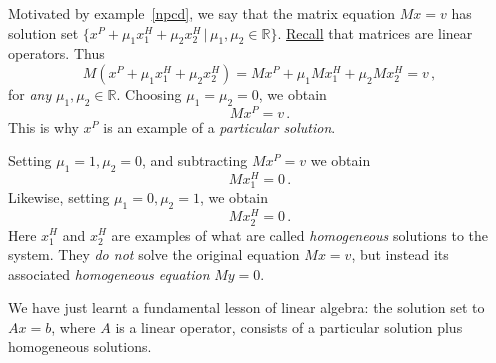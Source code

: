 %
%
Motivated by example~\ref{npcd}, we say that the matrix equation $Mx=v$ has  solution set  $\{ x^P  + \mu_1 x^H _1 + \mu_2 x^H _2\,  |\,  \mu_1,\mu_2 \in {\mathbb R} \}$.
\hyperlink{earlier}{Recall}  that matrices are linear operators.
%
%
Thus 
\[M( x^P  + \mu_1 x^H _1 + \mu_2 x^H _2)  = Mx^P  + \mu_1Mx^H _1 + \mu_2Mx^H _2 =v\, ,\]
for \emph{any} $\mu_1, \mu_2 \in \mathbb{R}$. 
Choosing $\mu_1=\mu_2=0$, we obtain 
\[Mx^P =v\, .\]  
This is why $x^P $ is an example of a  \emph{particular solution}.

Setting $\mu_1=1, \mu_2=0$, and subtracting $Mx^P =v$ we obtain 
\[Mx^H _1=0\, .\] 
Likewise, setting $\mu_1=0, \mu_2=1$, we obtain \[Mx^H _2=0\, .\]
Here $x^H _1$ and $x^H _2$ are examples of what are called  \emph{homogeneous} solutions to the system.
They {\itshape do not} solve the original equation $Mx=v$, but instead its associated 
{\itshape homogeneous  equation} $M y =0$.

We have just learnt a  fundamental lesson of linear algebra: the  solution set to $Ax=b$, where $A$ is a linear operator, consists of a particular solution plus homogeneous solutions.

\begin{center}
\end{center}

